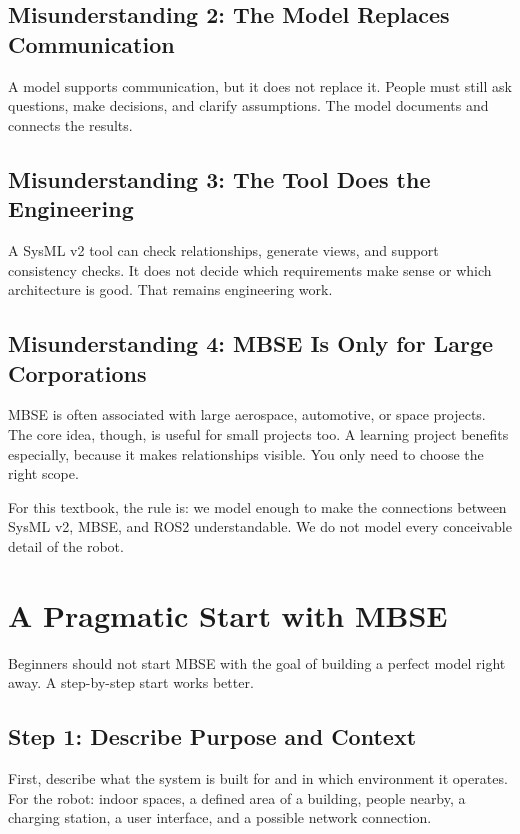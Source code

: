 \subsection{Misunderstanding 2: The Model Replaces Communication}
A model supports communication, but it does not replace it. People must still ask questions, make decisions, and clarify assumptions. The model documents and connects the results.

\subsection{Misunderstanding 3: The Tool Does the Engineering}
A SysML v2 tool can check relationships, generate views, and support consistency checks. It does not decide which requirements make sense or which architecture is good. That remains engineering work.

\subsection{Misunderstanding 4: MBSE Is Only for Large Corporations}
MBSE is often associated with large aerospace, automotive, or space projects. The core idea, though, is useful for small projects too. A learning project benefits especially, because it makes relationships visible. You only need to choose the right scope.

\begin{hinweisbox}
For this textbook, the rule is: we model enough to make the connections between SysML v2, MBSE, and ROS2 understandable. We do not model every conceivable detail of the robot.
\end{hinweisbox}

\section{A Pragmatic Start with MBSE}
Beginners should not start MBSE with the goal of building a perfect model right away. A step-by-step start works better.

\subsection{Step 1: Describe Purpose and Context}
First, describe what the system is built for and in which environment it operates. For the robot: indoor spaces, a defined area of a building, people nearby, a charging station, a user interface, and a possible network connection.


